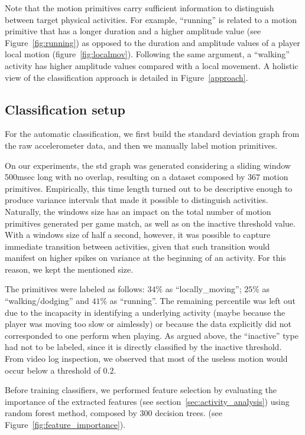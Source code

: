 Note that the motion primitives carry sufficient information to distinguish between target physical activities. For example, ``running'' is related to a motion primitive that has a longer duration and a higher amplitude value (see Figure~\ref{fig:running}) as opposed to the duration and amplitude values of a player local motion (figure~\ref{fig:localmov}). Following the same argument, a ``walking'' activity has higher amplitude values compared with a local movement. A holistic view of the classification approach is detailed in Figure~\ref{approach}. 

\subsection{Classification setup}

For the automatic classification, we first build the standard deviation graph from the raw accelerometer data, and then we manually label motion primitives. 

On our experiments, the std graph was generated considering a sliding window 500msec long with no overlap, resulting on a dataset composed by $367$ motion primitives. Empirically, this time length turned out to be descriptive enough to produce variance intervals that made it possible to distinguish activities. Naturally, the windows size has an impact on the total number of motion primitives generated per game match, as well as on the inactive threshold value. With a windows size of half a second, however, it was possible to capture immediate transition between activities, given that such transition would manifest on higher spikes on variance at the beginning of an activity. For this reason, we kept the mentioned size. 

The primitives were labeled as follows: $34\%$ as ``locally\_moving''; $25\%$ as ``walking/dodging'' and $41\%$ as ``running''. The remaining percentile was left out due to the incapacity in identifying a underlying activity (maybe because the player was moving too slow or aimlessly) or because the data explicitly did not corresponded to one perform when playing. As argued above, the ``inactive'' type had not to be labeled, since it is directly classified by the inactive threshold. From video log inspection, we observed that most of the useless motion would occur below a threshold of $0.2$.

Before training classifiers, we performed feature selection by evaluating the importance of the extracted features (see section~\ref{sec:activity_analysis}) using random forest method, composed by 300 decision trees. (see Figure~\ref{fig:feature_importance}).

